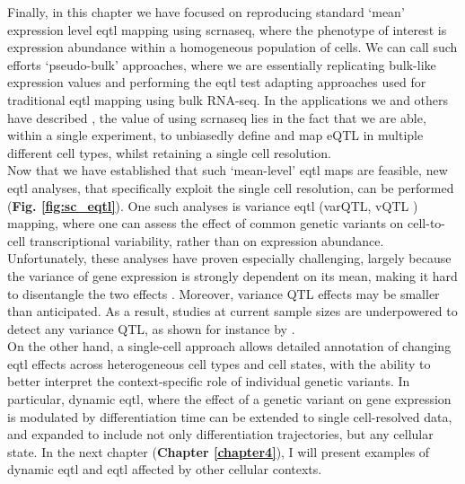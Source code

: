 Finally, in this chapter we have focused on reproducing standard `mean' expression level \gls{eqtl} mapping using \gls{scrnaseq}, where the phenotype of interest is expression abundance within a homogeneous population of cells.
We can call such efforts `pseudo-bulk' approaches, where we are essentially replicating bulk-like expression values and performing the \gls{eqtl} test adapting approaches used for traditional \gls{eqtl} mapping using bulk RNA-seq. 
In the applications we and others have described \cite{van2018single,cuomo2020single}, the value of using \gls{scrnaseq} lies in the fact that we are able, within a single experiment, to unbiasedly define and map eQTL in multiple different cell types, whilst retaining a single cell resolution.\\

Now that we have established that such `mean-level' \gls{eqtl} maps are feasible, new \gls{eqtl} analyses, that specifically exploit the single cell resolution, can be performed (\textbf{Fig. \ref{fig:sc_eqtl}}).
One such analyses is variance \gls{eqtl} (varQTL, vQTL \cite{ayroles2015behavioral}) mapping, where one can assess the effect of common genetic variants on cell-to-cell transcriptional variability, rather than on expression abundance.
Unfortunately, these analyses have proven especially challenging, largely because the variance of gene expression is strongly dependent on its mean, making it hard to disentangle the two effects \cite{vallejos2016beyond}.
Moreover, variance QTL effects may be smaller than anticipated.
As a result, studies at current sample sizes are underpowered to detect any variance QTL, as shown for instance by \cite{sarkar2019discovery}. \\

On the other hand, a single-cell approach allows detailed annotation of changing \gls{eqtl} effects across heterogeneous cell types and cell states, with the ability to better interpret the context-specific role of individual genetic variants. 
In particular, dynamic \gls{eqtl}, where the effect of a genetic variant on gene expression is modulated by differentiation time \cite{francesconi2014effects, strober2019dynamic} can be extended to single cell-resolved data, and expanded to include not only differentiation trajectories, but any cellular state.
In the next chapter (\textbf{Chapter \ref{chapter4}}), I will present examples of dynamic \gls{eqtl} and \gls{eqtl} affected by other cellular contexts.